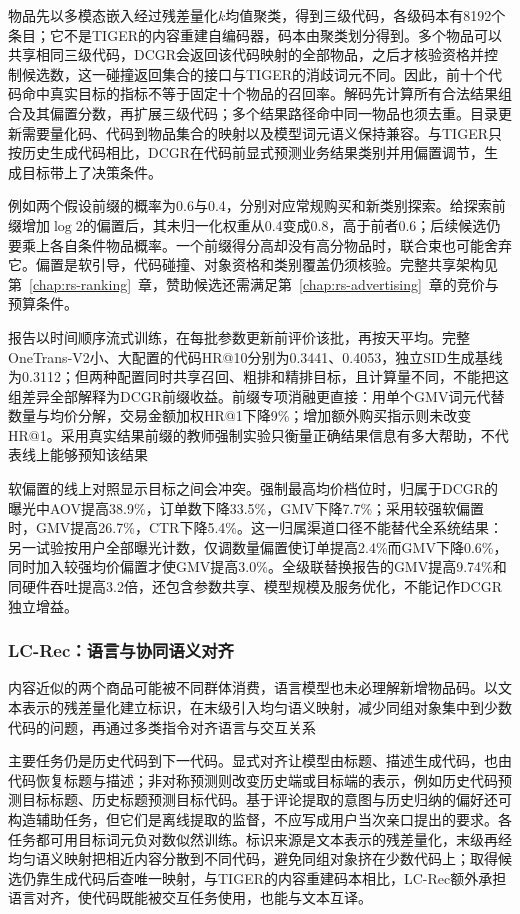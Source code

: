 物品先以多模态嵌入经过残差量化$k$均值聚类，得到三级代码，各级码本有8192个条目；它不是TIGER的内容重建自编码器，码本由聚类划分得到。多个物品可以共享相同三级代码，DCGR会返回该代码映射的全部物品，之后才核验资格并控制候选数，这一碰撞返回集合的接口与TIGER的消歧词元不同。因此，前十个代码命中真实目标的指标不等于固定十个物品的召回率。解码先计算所有合法结果组合及其偏置分数，再扩展三级代码；多个结果路径命中同一物品也须去重。目录更新需要量化码、代码到物品集合的映射以及模型词元语义保持兼容。与TIGER只按历史生成代码相比，DCGR在代码前显式预测业务结果类别并用偏置调节，生成目标带上了决策条件。

例如两个假设前缀的概率为0.6与0.4，分别对应常规购买和新类别探索。给探索前缀增加$\log2$的偏置后，其未归一化权重从0.4变成0.8，高于前者0.6；后续候选仍要乘上各自条件物品概率。一个前缀得分高却没有高分物品时，联合束也可能舍弃它。偏置是软引导，代码碰撞、对象资格和类别覆盖仍须核验。完整共享架构见第~\ref{chap:rs-ranking}~章，赞助候选还需满足第~\ref{chap:rs-advertising}~章的竞价与预算条件。

报告以时间顺序流式训练，在每批参数更新前评价该批，再按天平均。完整OneTrans-V2小、大配置的代码HR@10分别为0.3441、0.4053，独立SID生成基线为0.3112；但两种配置同时共享召回、粗排和精排目标，且计算量不同，不能把这组差异全部解释为DCGR前缀收益。前缀专项消融更直接：用单个GMV词元代替数量与均价分解，交易金额加权HR@1下降9\%；增加额外购买指示则未改变HR@1。采用真实结果前缀的教师强制实验只衡量正确结果信息有多大帮助，不代表线上能够预知该结果

软偏置的线上对照显示目标之间会冲突。强制最高均价档位时，归属于DCGR的曝光中AOV提高38.9\%，订单数下降33.5\%，GMV下降7.7\%；采用较强软偏置时，GMV提高26.7\%，CTR下降5.4\%。这一归属渠道口径不能替代全系统结果：另一试验按用户全部曝光计数，仅调数量偏置使订单提高2.4\%而GMV下降0.6\%，同时加入较强均价偏置才使GMV提高3.0\%。全级联替换报告的GMV提高9.74\%和同硬件吞吐提高3.2倍，还包含参数共享、模型规模及服务优化，不能记作DCGR独立增益。

\Needspace{85mm}
\subsubsection{LC-Rec：语言与协同语义对齐}
\label{sec:rs-lc-rec}

内容近似的两个商品可能被不同群体消费，语言模型也未必理解新增物品码。以文本表示的残差量化建立标识，在末级引入均匀语义映射，减少同组对象集中到少数代码的问题，再通过多类指令对齐语言与交互关系

主要任务仍是历史代码到下一代码。显式对齐让模型由标题、描述生成代码，也由代码恢复标题与描述；非对称预测则改变历史端或目标端的表示，例如历史代码预测目标标题、历史标题预测目标代码。基于评论提取的意图与历史归纳的偏好还可构造辅助任务，但它们是离线提取的监督，不应写成用户当次亲口提出的要求。各任务都可用目标词元负对数似然训练。标识来源是文本表示的残差量化，末级再经均匀语义映射把相近内容分散到不同代码，避免同组对象挤在少数代码上；取得候选仍靠生成代码后查唯一映射，与TIGER的内容重建码本相比，LC-Rec额外承担语言对齐，使代码既能被交互任务使用，也能与文本互译。

